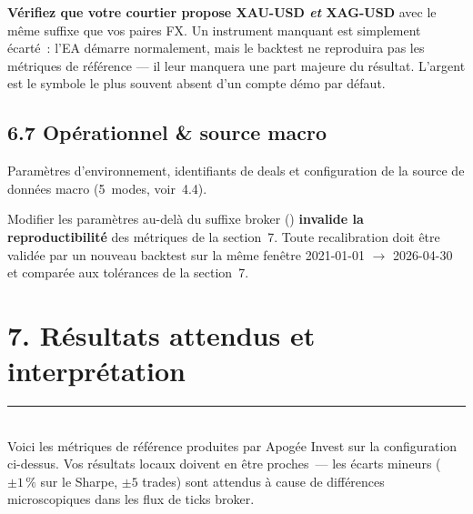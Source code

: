 \documentclass[11pt, a4paper]{scrartcl}
\begin{document}


\begin{warningbox}
\textbf{Vérifiez que votre courtier propose XAU-USD \emph{et} XAG-USD} avec le même
suffixe que vos paires FX. Un instrument manquant est simplement écarté~: l'EA démarre
normalement, mais le backtest ne reproduira pas les métriques de référence --- il leur
manquera une part majeure du résultat. L'argent est le symbole le plus souvent absent
d'un compte démo par défaut.
\end{warningbox}

\subsection*{6.7 Opérationnel \& source macro}

Paramètres d'environnement, identifiants de deals et configuration de la
source de données macro (5~modes, voir~4.4).



\begin{warningbox}
Modifier les paramètres au-delà du suffixe broker ()
\textbf{invalide la reproductibilité} des métriques de la section~7. Toute
recalibration doit être validée par un nouveau backtest sur la même fenêtre
2021-01-01 $\rightarrow$ 2026-04-30 et comparée aux tolérances de la
section~7.
\end{warningbox}


\section*{7. Résultats attendus et interprétation}
\vspace{-0.4em}
{\color{accent}\rule{\linewidth}{1.0pt}}\\[0.4em]

Voici les métriques de référence produites par Apogée Invest sur la
configuration ci-dessus. Vos résultats locaux doivent en être proches~--- les
écarts mineurs ($\pm 1\,\%$ sur le Sharpe, $\pm 5$ trades) sont attendus à
cause de différences microscopiques dans les flux de ticks broker.

\vspace{0.4em}
\end{document}
